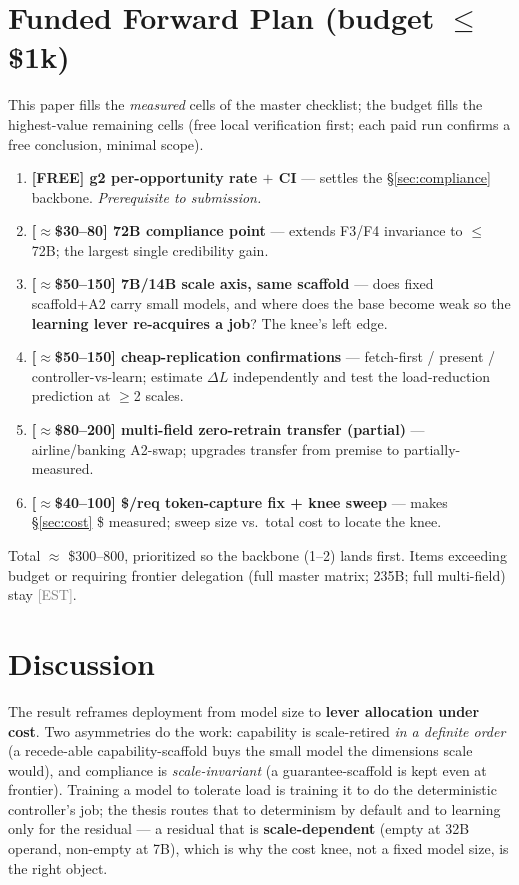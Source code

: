 \documentclass[10pt]{article}
\newcommand{\est}{\textcolor{gray}{\small[EST]}}
\begin{document}
\section{Funded Forward Plan (budget $\le$ \$1k)}\label{sec:plan2}
This paper fills the \emph{measured} cells of the master checklist; the budget fills the highest-value remaining cells (free local verification first; each paid run confirms a free conclusion, minimal scope).
\begin{enumerate}\itemsep1pt
\item \textbf{[FREE] g2 per-opportunity rate $+$ CI} --- settles the \S\ref{sec:compliance} backbone. \emph{Prerequisite to submission.}
\item \textbf{[$\approx$\$30--80] 72B compliance point} --- extends F3/F4 invariance to $\le$72B; the largest single credibility gain.
\item \textbf{[$\approx$\$50--150] 7B/14B scale axis, same scaffold} --- does fixed scaffold+A2 carry small models, and where does the base become weak so the \textbf{learning lever re-acquires a job}? The knee's left edge.
\item \textbf{[$\approx$\$50--150] cheap-replication confirmations} --- fetch-first / present / controller-vs-learn; estimate $\Delta L$ independently and test the load-reduction prediction at $\ge$2 scales.
\item \textbf{[$\approx$\$80--200] multi-field zero-retrain transfer (partial)} --- airline/banking A2-swap; upgrades transfer from premise to partially-measured.
\item \textbf{[$\approx$\$40--100] \$/req token-capture fix + knee sweep} --- makes \S\ref{sec:cost} \$ measured; sweep size vs.\ total cost to locate the knee.
\end{enumerate}
Total $\approx$ \$300--800, prioritized so the backbone (1--2) lands first. Items exceeding budget or requiring frontier delegation (full master matrix; 235B; full multi-field) stay \est.

\section{Discussion}
The result reframes deployment from model size to \textbf{lever allocation under cost}. Two asymmetries do the work: capability is scale-retired \emph{in a definite order} (a recede-able capability-scaffold buys the small model the dimensions scale would), and compliance is \emph{scale-invariant} (a guarantee-scaffold is kept even at frontier). Training a model to tolerate load is training it to do the deterministic controller's job; the thesis routes that to determinism by default and to learning only for the residual --- a residual that is \textbf{scale-dependent} (empty at 32B operand, non-empty at 7B), which is why the cost knee, not a fixed model size, is the right object.
\end{document}
